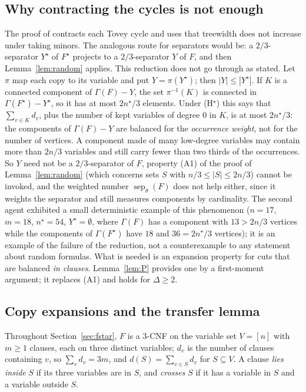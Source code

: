 \documentclass[11pt,a4paper]{article}
\theoremstyle{definition}
\theoremstyle{remark}
\newcommand{\sepw}{\operatorname{sep}_{\theta}}
\newcommand{\Gr}{\Gamma}
\begin{document}
\subsection{Why contracting the cycles is not enough}\label{sec:fstar-obst}

The proof of \cite[Theorem~8.3(a)]{DL} contracts each Tovey cycle and uses that treewidth
does not increase under taking minors. The analogous route for separators would be: a
$2/3$-separator $Y^\star$ of $F^\star$ projects to a $2/3$-separator $Y$ of $F$, and then
Lemma~\ref{lem:random} applies. This reduction does not go through as stated. Let $\pi$ map
each copy to its variable and put $Y=\pi(Y^\star)$; then $|Y|\le|Y^\star|$. If $K$ is a
connected component of $\Gr(F)-Y$, the set $\pi^{-1}(K)$ is connected in
$\Gr(F^\star)-Y^\star$, so it has at most $2n^\star/3$ elements. Under (H$^\star$) this says
that $\sum_{v\in K}d_v$, plus the number of kept variables of degree $0$ in $K$, is at most
$2n^\star/3$: the components of $\Gr(F)-Y$ are
balanced for the \emph{occurrence weight}, not for the number of vertices. A component made
of many low-degree variables may contain more than $2n/3$ variables and still carry fewer
than two thirds of the occurrences. So $Y$ need not be a $2/3$-separator of $F$, property
(A1) of the proof of Lemma~\ref{lem:random} (which concerns sets $S$ with
$n/3\le|S|\le2n/3$) cannot be invoked, and the weighted number $\sepw(F)$ does not help
either, since it weights the separator and still measures components by cardinality. The
second agent exhibited a small deterministic example of this phenomenon ($n=17$, $m=18$,
$n^\star=54$, $Y^\star=\emptyset$, where $\Gr(F)$ has a component with $13>2n/3$ vertices
while the components of $\Gr(F^\star)$ have $18$ and $36=2n^\star/3$ vertices); it is an
example of the failure of the reduction, not a counterexample to any statement about random
formulas. What is needed is an expansion property for cuts that are balanced \emph{in
clauses}. Lemma~\ref{lem:P} provides one by a first-moment argument; it replaces (A1) and
holds for $\Delta\ge2$.

\subsection{Copy expansions and the transfer lemma}

Throughout Section~\ref{sec:fstar}, $F$ is a 3-CNF on the variable set $V=[n]$ with $m\ge1$
clauses, each on three distinct variables; $d_v$ is the number of clauses containing $v$, so
$\sum_vd_v=3m$, and $d(S)=\sum_{v\in S}d_v$ for $S\subseteq V$. A clause \emph{lies inside}
$S$ if its three variables are in $S$, and \emph{crosses} $S$ if it has a variable in $S$
and a variable outside $S$.
\end{document}
